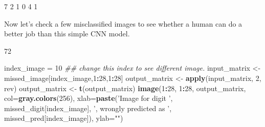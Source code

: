 \documentclass[12pt,]{krantz}
\makeatletter
\newenvironment{Shaded}{\begin{snugshade}}{\end{snugshade}}
\newcommand{\CommentTok}[1]{\textcolor[rgb]{0.37,0.37,0.37}{\textit{#1}}}
\newcommand{\DataTypeTok}[1]{\textcolor[rgb]{0.27,0.27,0.27}{#1}}
\newcommand{\DecValTok}[1]{\textcolor[rgb]{0.06,0.06,0.06}{#1}}
\newcommand{\KeywordTok}[1]{\textcolor[rgb]{0.27,0.27,0.27}{\textbf{#1}}}
\newcommand{\NormalTok}[1]{#1}
\newcommand{\OperatorTok}[1]{\textcolor[rgb]{0.43,0.43,0.43}{\textbf{#1}}}
\newcommand{\StringTok}[1]{\textcolor[rgb]{0.5,0.5,0.5}{#1}}
\newenvironment{kframe}{%
\medskip{}
\setlength{\fboxsep}{.8em}
 \def\at@end@of@kframe{}%
 \ifinner\ifhmode%
  \def\at@end@of@kframe{\end{minipage}}%
  \begin{minipage}{\columnwidth}%
 \fi\fi%
 \def\FrameCommand##1{\hskip\@totalleftmargin \hskip-\fboxsep
 \colorbox{shadecolor}{##1}\hskip-\fboxsep
     \hskip-\linewidth \hskip-\@totalleftmargin \hskip\columnwidth}%
 \MakeFramed {\advance\hsize-\width
   \@totalleftmargin\z@ \linewidth\hsize
   \@setminipage}}%
 {\par\unskip\endMakeFramed%
 \at@end@of@kframe}
\renewenvironment{Shaded}{\begin{kframe}}{\end{kframe}}
\makeatother
\begin{document}
\begin{Shaded}
\begin{Highlighting}[]
\NormalTok{[1] 7 2 1 0 4 1}
\end{Highlighting}
\end{Shaded}

Now let's check a few misclassified images to see whether a human can do a better job than this simple CNN model.

\begin{Shaded}
\end{Shaded}

\begin{Shaded}
\begin{Highlighting}[]
\NormalTok{[1] 72}
\end{Highlighting}
\end{Shaded}

\begin{Shaded}
\end{Shaded}

\begin{Shaded}
\begin{Highlighting}[]
\NormalTok{index_image =}\StringTok{ }\DecValTok{10} \CommentTok{## change this index to see different image.}
\NormalTok{input_matrix <-}\StringTok{ }\NormalTok{missed_image[index_image,}\DecValTok{1}\OperatorTok{:}\DecValTok{28}\NormalTok{,}\DecValTok{1}\OperatorTok{:}\DecValTok{28}\NormalTok{]}
\NormalTok{output_matrix <-}\StringTok{ }\KeywordTok{apply}\NormalTok{(input_matrix, }\DecValTok{2}\NormalTok{, rev)}
\NormalTok{output_matrix <-}\StringTok{ }\KeywordTok{t}\NormalTok{(output_matrix)}
\KeywordTok{image}\NormalTok{(}\DecValTok{1}\OperatorTok{:}\DecValTok{28}\NormalTok{, }\DecValTok{1}\OperatorTok{:}\DecValTok{28}\NormalTok{, output_matrix, }\DataTypeTok{col=}\KeywordTok{gray.colors}\NormalTok{(}\DecValTok{256}\NormalTok{), }
\DataTypeTok{xlab=}\KeywordTok{paste}\NormalTok{(}\StringTok{'Image for digit '}\NormalTok{, missed_digit[index_image], }\StringTok{', }
\StringTok{wrongly predicted as '}\NormalTok{, missed_pred[index_image]), }\DataTypeTok{ylab=}\StringTok{""}\NormalTok{)}
\end{Highlighting}
\end{Shaded}
\end{document}
